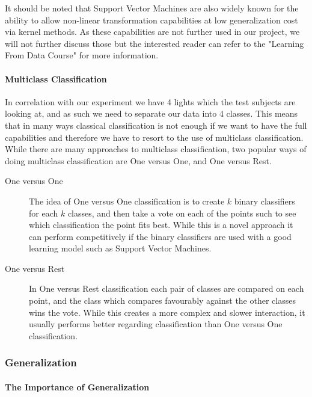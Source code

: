 It should be noted that Support Vector Machines are also widely known for the ability
to allow non-linear transformation capabilities at low generalization cost via kernel methods. As these capabilities are not further used in our project, we will not further
discuss those but the interested reader can refer to the "Learning From Data Course"\cite{learningfromdata2012course} for more information.

\paragraph{Multiclass Classification}
\label{par:MulticlassClassification}
In correlation with our experiment we have 4 lights which the test subjects are looking at, and as such we need to separate our data into 4 classes.
This means that in many ways classical classification is not enough if we want to have the full capabilities and therefore we have to resort to the use
of multiclass classification. While there are many approaches to multiclass classification,
two popular ways of doing multiclass classification are One versus One, and One versus Rest\cite{aly2005survey}\cite{scikitlearn2012multiclass}.
\begin{description}
  \item[One versus One] The idea of One versus One classification is to create $k$ binary classifiers for each $k$ classes,
    and then take a vote on each of the points such to see which classification the point fits best.
    While this is a novel approach it can perform competitively if the binary classifiers are used with a good learning model such as Support Vector Machines.
  \item[One versus Rest] In One versus Rest classification each pair of classes are compared on each point, and the class which compares favourably against the other classes
    wins the vote. While this creates a more complex and slower interaction, it usually performs better regarding classification than One versus One classification.
\end{description}

\subsubsection{Generalization}
\label{ssub:Generalization}
\paragraph{The Importance of Generalization}
\label{par:TheImportanceofGeneralization}
